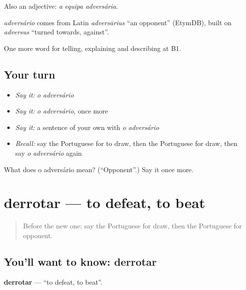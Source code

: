 Also an adjective: \emph{a equipa adversária}.

\begin{cousinweb}
\emph{adversário} comes from Latin \emph{adversārius} \textquotedblleft{}an opponent\textquotedblright{} (EtymDB), built on \emph{adversus} \textquotedblleft{}turned towards, against\textquotedblright{}.
\end{cousinweb}

\begin{grammarlens}[title={What you've built}]
One more word for telling, explaining and describing at B1.
\end{grammarlens}

\subsection*{Your turn}
\begin{itemize}
\raggedright
  \item \emph{Say it:} \emph{o adversário}
  \item \emph{Say it:} \emph{o adversário}, once more
  \item \emph{Say it:} a sentence of your own with \emph{o adversário}
  \item \emph{Recall:} say the Portuguese for to draw, then the Portuguese for draw, then say \emph{o adversário} again
\end{itemize}

\begin{tcolorbox}[breakable,colback=teal!4,colframe=teal!35!black,title={Before you move on}]
What does o adversário mean? (\textquotedblleft{}Opponent\textquotedblright{}.) Say it once more.
\end{tcolorbox}
\section[derrotar]{derrotar — to defeat, to beat}

\label{lesson:PT-C510-derrotar}



\begin{quote}
Before the new one: say the Portuguese for draw, then the Portuguese for opponent.
\end{quote}

\subsection*{You'll want to know: derrotar}
\textbf{derrotar} — \textquotedblleft{}to defeat, to beat\textquotedblright{}.

